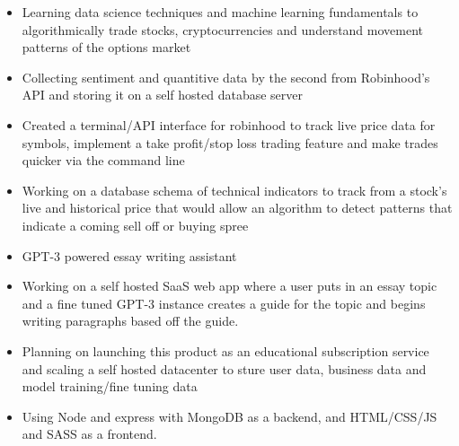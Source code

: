 \documentclass[10pt,a4paper,ragged2e]{altacv}
\begin{document}

\begin{fullwidth}
\makecvheader
\end{fullwidth}


\begin{itemize}
\item Learning data science techniques and machine learning fundamentals to algorithmically trade stocks, cryptocurrencies and understand movement patterns of the options market
\smallskip
\item Collecting sentiment and quantitive data by the second from Robinhood's API and storing it on a self hosted database server
\smallskip
\item Created a terminal/API interface for robinhood to track live price data for symbols, implement a take profit/stop loss trading feature and make trades quicker via the command line 
\smallskip
\item Working on a database schema of technical indicators to track from a stock's live and historical price that would allow an algorithm to detect patterns that indicate a coming sell off or buying spree
\end{itemize}
\smallskip
\smallskip
{}
\begin{itemize}
\item GPT-3 powered essay writing assistant
\smallskip
\item Working on a self hosted SaaS web app where a user puts in an essay topic and a fine tuned GPT-3 instance creates a guide for the topic and begins writing paragraphs based off the guide. 
\smallskip
\item Planning on launching this product as an educational subscription service and scaling a self hosted datacenter to sture user data, business data and model training/fine tuning data
\smallskip
\item Using Node and express with MongoDB as a backend, and HTML/CSS/JS and SASS as a frontend. 
\end{itemize}
\end{document}
